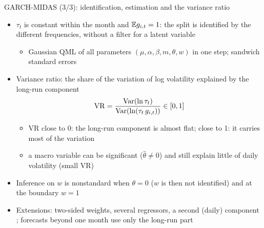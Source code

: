 \begin{frame}{GARCH-MIDAS (3/3): identification, estimation and the variance ratio}
\itemsize{\small}
\begin{itemize}
    \item $\tau_t$ is constant within the month and $\mathbb{E} g_{i,t} = 1$: the split is identified by the different frequencies, without a filter for a latent variable
    \begin{itemize}
        \item Gaussian QML of all parameters $(\mu, \alpha, \beta, m, \theta, w)$ in one step; sandwich standard errors
    \end{itemize}
    \item Variance ratio: the share of the variation of log volatility explained by the long-run component
    \[ \mathrm{VR} = \frac{\text{Var}(\ln\tau_t)}{\text{Var}(\ln(\tau_t\,g_{i,t}))} \in [0, 1] \]
    \begin{itemize}
        \item VR close to 0: the long-run component is almost flat; close to 1: it carries most of the variation
        \item a macro variable can be significant ($\hat\theta \ne 0$) and still explain little of daily volatility (small VR)
    \end{itemize}
    \item Inference on $w$ is nonstandard when $\theta = 0$ ($w$ is then not identified) and at the boundary $w = 1$
    \item Extensions: two-sided weights, several regressors, a second (daily) component ; forecasts beyond one month use only the long-run part
\end{itemize}
\end{frame}

